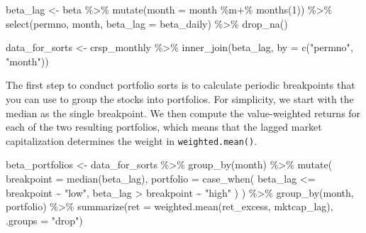 \documentclass[
]{krantz}
\newenvironment{Shaded}{\begin{snugshade}}{\end{snugshade}}
\newcommand{\AttributeTok}[1]{\textcolor[rgb]{0.61,0.61,0.61}{#1}}
\newcommand{\DecValTok}[1]{\textcolor[rgb]{0.06,0.06,0.06}{#1}}
\newcommand{\FunctionTok}[1]{\textcolor[rgb]{0,0,0}{#1}}
\newcommand{\NormalTok}[1]{#1}
\newcommand{\OtherTok}[1]{\textcolor[rgb]{0.37,0.37,0.37}{#1}}
\newcommand{\SpecialCharTok}[1]{\textcolor[rgb]{0,0,0}{#1}}
\newcommand{\StringTok}[1]{\textcolor[rgb]{0.5,0.5,0.5}{#1}}
\begin{document}
\begin{Shaded}
\begin{Highlighting}[]
\NormalTok{beta\_lag }\OtherTok{\textless{}{-}}\NormalTok{ beta }\SpecialCharTok{\%\textgreater{}\%}
  \FunctionTok{mutate}\NormalTok{(}\AttributeTok{month =}\NormalTok{ month }\SpecialCharTok{\%m+\%} \FunctionTok{months}\NormalTok{(}\DecValTok{1}\NormalTok{)) }\SpecialCharTok{\%\textgreater{}\%}
  \FunctionTok{select}\NormalTok{(permno, month, }\AttributeTok{beta\_lag =}\NormalTok{ beta\_daily) }\SpecialCharTok{\%\textgreater{}\%}
  \FunctionTok{drop\_na}\NormalTok{()}

\NormalTok{data\_for\_sorts }\OtherTok{\textless{}{-}}\NormalTok{ crsp\_monthly }\SpecialCharTok{\%\textgreater{}\%}
  \FunctionTok{inner\_join}\NormalTok{(beta\_lag, }\AttributeTok{by =} \FunctionTok{c}\NormalTok{(}\StringTok{"permno"}\NormalTok{, }\StringTok{"month"}\NormalTok{))}
\end{Highlighting}
\end{Shaded}

The first step to conduct portfolio sorts is to calculate periodic breakpoints that you can use to group the stocks into portfolios.
For simplicity, we start with the median as the single breakpoint.
We then compute the value-weighted returns for each of the two resulting portfolios, which means that the lagged market capitalization determines the weight in \texttt{weighted.mean()}.

\begin{Shaded}
\begin{Highlighting}[]
\NormalTok{beta\_portfolios }\OtherTok{\textless{}{-}}\NormalTok{ data\_for\_sorts }\SpecialCharTok{\%\textgreater{}\%}
  \FunctionTok{group\_by}\NormalTok{(month) }\SpecialCharTok{\%\textgreater{}\%}
  \FunctionTok{mutate}\NormalTok{(}
    \AttributeTok{breakpoint =} \FunctionTok{median}\NormalTok{(beta\_lag),}
    \AttributeTok{portfolio =} \FunctionTok{case\_when}\NormalTok{(}
\NormalTok{      beta\_lag }\SpecialCharTok{\textless{}=}\NormalTok{ breakpoint }\SpecialCharTok{\textasciitilde{}} \StringTok{"low"}\NormalTok{,}
\NormalTok{      beta\_lag }\SpecialCharTok{\textgreater{}}\NormalTok{ breakpoint }\SpecialCharTok{\textasciitilde{}} \StringTok{"high"}
\NormalTok{    )}
\NormalTok{  ) }\SpecialCharTok{\%\textgreater{}\%}
  \FunctionTok{group\_by}\NormalTok{(month, portfolio) }\SpecialCharTok{\%\textgreater{}\%}
  \FunctionTok{summarize}\NormalTok{(}\AttributeTok{ret =} \FunctionTok{weighted.mean}\NormalTok{(ret\_excess, mktcap\_lag), }\AttributeTok{.groups =} \StringTok{"drop"}\NormalTok{)}
\end{Highlighting}
\end{Shaded}
\end{document}
